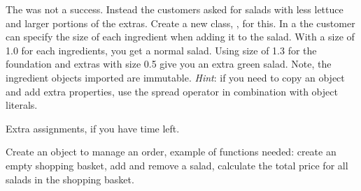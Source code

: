 \documentclass[fleqn, article, a4paper]{memoir}
\begin{document}
\begin{Assignments}
\item The  was not a success. Instead the customers asked for salads with less lettuce and larger portions of the extras. Create a new class, , for this. In a  the customer can specify the size of each ingredient when adding it to the salad. With a size of 1.0 for each ingredients, you get a normal salad. Using size of 1.3 for the foundation and extras with size 0.5 give you an extra green salad. Note, the ingredient objects imported are immutable. \emph{Hint}: if you need to copy an object and add extra properties, use the spread operator in combination with object literals.


\end{Assignments}

\noindent Extra assignments, if you have time left.
\begin{Assignments}

\item Create an object to manage an order, example of functions needed: create an empty shopping basket, add and remove a salad, calculate the total price for all salads in the shopping basket.

\end{Assignments}


\end{document}
